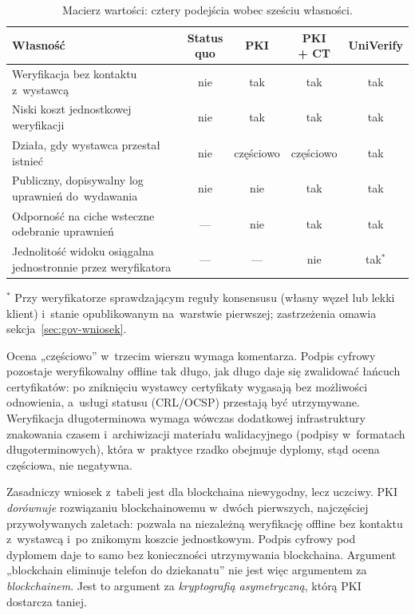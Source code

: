 \begin{table}[H]
\centering
\caption{Macierz wartości: cztery podejścia wobec sześciu własności.}
\label{tab:gov-value}
\begin{tabular}{@{}lcccc@{}}
\toprule
Własność & \makecell{Status\\quo} & PKI & \makecell{PKI\\+ CT} & UniVerify \\
\midrule
Weryfikacja bez kontaktu z~wystawcą                & nie & tak & tak & tak \\
Niski koszt jednostkowej weryfikacji              & nie & tak & tak & tak \\
Działa, gdy wystawca przestał istnieć              & nie & częściowo & częściowo & tak \\
Publiczny, dopisywalny log uprawnień do~wydawania & nie & nie & tak & tak \\
Odporność na ciche wsteczne odebranie uprawnień   & --- & nie & tak & tak \\
\makecell[l]{Jednolitość widoku osiągalna\\jednostronnie przez weryfikatora} & --- & --- & nie & tak$^\ast$ \\
\bottomrule
\end{tabular}

\smallskip
\begin{minipage}{0.92\textwidth}\footnotesize\raggedright
$^\ast$ Przy weryfikatorze sprawdzającym reguły konsensusu (własny węzeł lub
lekki klient) i~stanie opublikowanym na~warstwie pierwszej; zastrzeżenia
omawia sekcja~\ref{sec:gov-wniosek}.
\end{minipage}
\end{table}

Ocena „częściowo'' w~trzecim wierszu wymaga komentarza. Podpis cyfrowy
pozostaje weryfikowalny offline tak długo, jak długo daje się zwalidować
łańcuch certyfikatów: po zniknięciu wystawcy certyfikaty wygasają bez
możliwości odnowienia, a~usługi statusu (CRL/OCSP) przestają być utrzymywane.
Weryfikacja długoterminowa wymaga wówczas dodatkowej infrastruktury
znakowania czasem i~archiwizacji materiału walidacyjnego (podpisy w~formatach
długoterminowych), która w~praktyce rzadko obejmuje dyplomy, stąd ocena
częściowa, nie negatywna.

Zasadniczy wniosek z~tabeli jest dla blockchaina niewygodny, lecz uczciwy. PKI
\emph{dorównuje} rozwiązaniu blockchainowemu w~dwóch pierwszych, najczęściej
przywoływanych zaletach: pozwala na niezależną weryfikację offline bez kontaktu
z~wystawcą i~po znikomym koszcie jednostkowym. Podpis cyfrowy pod dyplomem daje to
samo bez konieczności utrzymywania blockchaina. Argument „blockchain eliminuje
telefon do dziekanatu'' nie jest więc argumentem za \emph{blockchainem}. Jest to
argument za \emph{kryptografią asymetryczną}, którą PKI dostarcza taniej.

